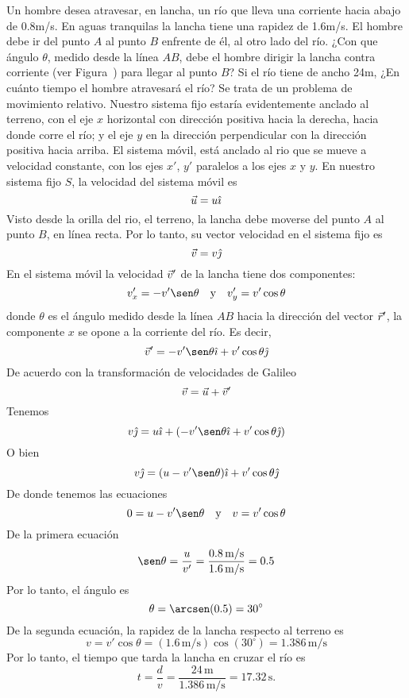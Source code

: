 \begin{example}{}{}
    Un hombre desea atravesar, en lancha, un río que lleva una corriente hacia abajo de 0.8m/s. En aguas tranquilas la lancha tiene una rapidez de 1.6m/s. El hombre debe ir del punto $A$ al punto $B$ enfrente de él, al otro lado del río. ¿Con que ángulo $\theta$, medido desde la línea $AB$, debe el hombre dirigir la lancha contra corriente (ver Figura~) para llegar al punto $B$? Si el río tiene de ancho 24m, ¿En cuánto tiempo el hombre atravesará el río?
    \sol Se trata de un problema de movimiento relativo. Nuestro sistema fijo estaría evidentemente anclado al terreno, con el eje $x$ horizontal con dirección positiva hacia la derecha, hacia donde corre el río; y el eje $y$ en la dirección perpendicular con la dirección positiva hacia arriba. El sistema móvil, está anclado al rio que se mueve a velocidad constante, con los ejes $x'$, $y'$ paralelos a los ejes $x$ y $y$. En nuestro sistema fijo $S$, la velocidad del sistema móvil es
        $$\vec{u} = u\hat{\imath}$$
        Visto desde la orilla del rio, el terreno, la lancha debe moverse del punto $A$ al punto $B$, en línea recta. Por lo tanto, su vector velocidad en el sistema fijo es
        $$\vec{v} = v\hat{\jmath}$$
        En el sistema móvil la velocidad $\vec{v}'$ de la lancha tiene dos componentes:
        $$v_x' = -v'\sen\theta \quad \text{y} \quad v_y' = v'\cos\theta$$
        donde $\theta$ es el ángulo medido desde la línea $AB$ hacia la dirección del vector $\vec{r}'$, la componente $x$ se opone a la corriente del río. Es decir,
        $$\veloi' = -v'\sen\theta\veci + v'\cos\theta\vecj$$
        De acuerdo con la transformación de velocidades de Galileo
        $$\vec{v} = \vec{u} + \vec{v}'$$
        Tenemos
        $$v\vecj = u\veci + (-v'\sen\theta\veci + v'\cos\theta\vecj)$$
        O bien
        $$v\vecj = (u-v'\sen\theta)\veci + v'\cos\theta\vecj$$
        De donde tenemos las ecuaciones
        $$0 = u-v'\sen\theta \quad \text{y} \quad v = v'\cos\theta$$
        De la primera ecuación
        $$\sen\theta = \frac{u}{v'} = \frac{0.8\,\text{m/s}}{1.6\,\text{m/s}} = 0.5$$
        Por lo tanto, el ángulo es
        $$\theta = \arcsen(0.5) = 30^\circ$$
        De la segunda ecuación, la rapidez de la lancha respecto al terreno es
        $$v = v'\cos\theta = (1.6\,\text{m/s})\cos(30^\circ) = 1.386\,\text{m/s}$$
        Por lo tanto, el tiempo que tarda la lancha en cruzar el río es
        \begin{equation*}
            t = \frac{d}{v} = \frac{24\,\text{m}}{1.386\,\text{m/s}} = 17.32\,\text{s}. \tag*{\Square}
        \end{equation*}
\end{example}

